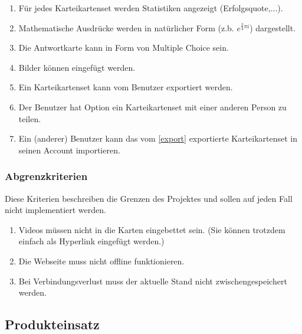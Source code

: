 \begin{enumerate}[leftmargin=2cm, label=\bfseries /WK\arabic*0/]
	\item Für jedes Karteikartenset werden Statistiken angezeigt (Erfolgsquote,...).
	\item Mathematische Ausdrücke werden in natürlicher Form (z.b. \( e^{\frac{3}{4}\pi i}\)) dargestellt.
	\item Die Antwortkarte kann in Form von Multiple Choice sein.
	\item Bilder können eingefügt werden.
	\item\label{export} Ein Karteikartenset kann vom Benutzer exportiert werden.
	\item\label{share} Der Benutzer hat Option ein Karteikartenset mit einer anderen Person zu teilen.
	\item Ein (anderer) Benutzer kann das vom \ref{export} exportierte Karteikartenset in seinen Account importieren.
\end{enumerate}

\subsubsection{Abgrenzkriterien}
Diese Kriterien beschreiben die Grenzen des Projektes und sollen auf jeden Fall nicht implementiert werden.

\begin{enumerate}[leftmargin=2cm, label=\bfseries /AK\arabic*0/]
	\item Videos müssen nicht in die Karten eingebettet sein. (Sie können trotzdem einfach als Hyperlink eingefügt werden.)
	\item Die Webseite muss nicht offline funktionieren.
	\item Bei Verbindungsverlust muss der aktuelle Stand nicht zwischengespeichert werden.
\end{enumerate}



\newpage
\subsection{Produkteinsatz}

